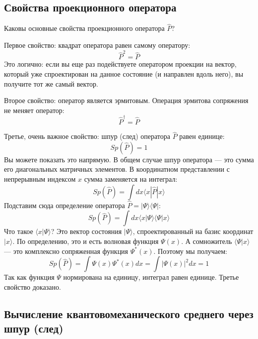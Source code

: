 \documentclass[../general/general]{subfiles}
\begin{document}
\subsection{Свойства проекционного оператора}

Каковы основные свойства проекционного оператора $\hat{P}$?

Первое свойство: квадрат оператора равен самому оператору:
\begin{equation}
    \hat{P}^2 = \hat{P}
\end{equation}
Это логично: если вы еще раз подействуете оператором проекции на вектор, который уже спроектирован на данное состояние (и направлен вдоль него), вы получите тот же самый вектор.

Второе свойство: оператор является эрмитовым. Операция эрмитова сопряжения не меняет оператор:
\begin{equation}
    \hat{P}^\dagger = \hat{P}
\end{equation}

Третье, очень важное свойство: шпур (след) оператора $\hat{P}$ равен единице:
\begin{equation}
    Sp(\hat{P}) = 1
\end{equation}
Вы можете показать это напрямую. В общем случае шпур оператора — это сумма его диагональных матричных элементов. В координатном представлении с непрерывным индексом $x$ сумма заменяется на интеграл:
\begin{equation}
    Sp(\hat{P}) = \int dx \langle x | \hat{P} | x \rangle
\end{equation}
Подставим сюда определение оператора $\hat{P} = |\Psi\rangle \langle \Psi|$:
\begin{equation}
    Sp(\hat{P}) = \int dx \langle x | \Psi \rangle \langle \Psi | x \rangle
\end{equation}
Что такое $\langle x | \Psi \rangle$? Это вектор состояния $|\Psi\rangle$, спроектированный на базис координат $|x\rangle$. По определению, это и есть волновая функция $\Psi(x)$. А сомножитель $\langle \Psi | x \rangle$ — это комплексно сопряженная функция $\Psi^*(x)$. Поэтому мы получаем:
\begin{equation}
    Sp(\hat{P}) = \int \Psi(x) \Psi^*(x) dx = \int |\Psi(x)|^2 dx = 1
\end{equation}
Так как функция $\Psi$ нормирована на единицу, интеграл равен единице. Третье свойство доказано.

\subsection{Вычисление квантовомеханического среднего через шпур (след)}
\end{document}
